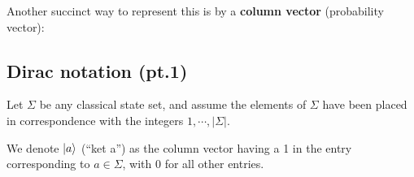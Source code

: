 \documentclass{report}
\begin{document}
\newpage

Another succinct way to represent this is by a \textbf{column vector} (probability vector):


\subsection{Dirac notation (pt.1)}
Let $\Sigma$ be any classical state set, and assume the elements of $\Sigma$ have been placed in correspondence with the integers $1,\cdots,|\Sigma|$.

\bigbreak

We denote $\ket{a}$ (``ket a'') as the column vector having a 1 in the entry corresponding to $a\in\Sigma$, with 0 for all other entries.
\end{document}
